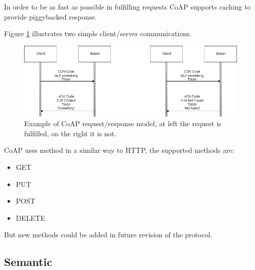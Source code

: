 	In order to be as fast as possible in fulfilling requests CoAP supports caching to provide piggybacked response.\newline
	
	Figure \ref{fig:coap0} illustrates two simple client/server communications.
	
	\begin{figure}
		\includegraphics[width=\linewidth]{coap-img0.png}
		\caption{Example of CoAP request/response model, at left the request is fulfilled, on the right it is not.}
		\label{fig:coap0}
	\end{figure}
	
	CoAP uses method in a similar way to HTTP, the supported methods are: \newline
	\begin{itemize}
		\item GET
		\item PUT
		\item POST
		\item DELETE
	\end{itemize}
	But new methods could be added in future revision of the protocol.\newline
	
	\subsection{Semantic}
	
